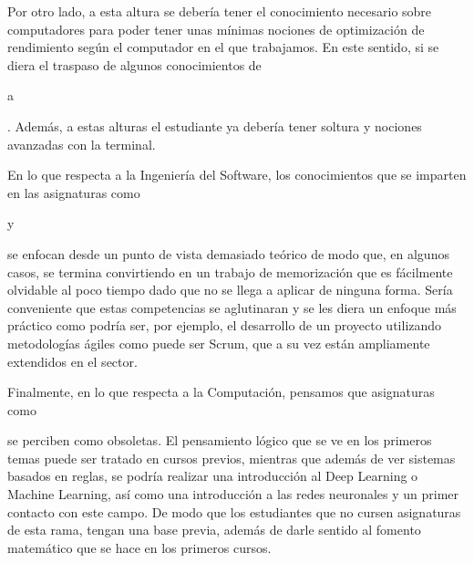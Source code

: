 Por otro lado, a esta altura se debería tener el conocimiento necesario sobre computadores 
para poder tener unas mínimas nociones de optimización de rendimiento según el computador 
en el que trabajamos. En este sentido, si se diera el traspaso de algunos conocimientos de 
\subject{Arquitectura y Organización de Computadores} a \subject{Ampliación de Estructura 
de Computadores}. 
Además, a estas alturas el estudiante ya debería tener soltura y nociones 
avanzadas con la terminal.

En lo que respecta a la Ingeniería del Software, los conocimientos que se imparten en las 
asignaturas como \subject{Procesos de Desarrollo Software} y \subject{Gestión de Proyectos 
de Desarrollo de Software} se enfocan desde un punto de vista demasiado teórico de modo que, 
en algunos casos, se termina convirtiendo en un trabajo de memorización que es fácilmente 
olvidable al poco tiempo dado que no se llega a aplicar de ninguna forma. Sería conveniente 
que estas competencias se aglutinaran y se les diera un enfoque más práctico como podría ser, 
por ejemplo, el desarrollo de un proyecto utilizando metodologías ágiles como puede ser Scrum, 
que a su vez están ampliamente extendidos en el sector.


Finalmente, en lo que respecta a la Computación, pensamos que asignaturas como 
\subject{Sistemas inteligentes} se perciben como obsoletas. El pensamiento lógico que se ve 
en los primeros temas puede ser tratado en cursos previos, mientras que además de ver 
sistemas basados en reglas, se podría realizar una introducción al Deep Learning o Machine 
Learning, así como una introducción a las redes neuronales y un primer contacto con este 
campo. De modo que los estudiantes que no cursen asignaturas de esta rama, tengan una base previa, 
además de darle sentido al fomento matemático que se hace en los primeros cursos.


